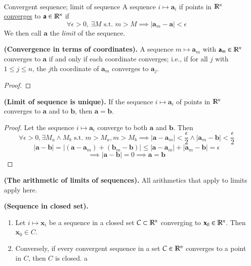 \\

\begin{defn}{Convergent sequence; limit of sequence}
A sequence $i \mapsto \bm{a}_i$ if points in $\mathbb{R}^n$ \ul{converges} to $\textbf{a}\in \mathbb{R}^n$ if
\[\forall \epsilon > 0,\ \exists M \text{ s.t. } m > M \implies |\bm{a}_m-\bm{a}| < \epsilon\]
We then call $\bm{a}$ the \textit{limit} of the sequence.
\end{defn}

\begin{proposition}
  \textbf{(Convergence in terms of coordinates).} A sequence $m\mapsto \bm{a}_m$ with $\textbf{a}_m\in\mathbb{R}^n$ converges to $\bm{a}$ if and only if each coordinate converges; i.e., if for all $j$ with $1\leq j\leq n$, the $j$th coordinate of $\bm{a}_m$ converges to $\bm{a}_j$.
\end{proposition}

\begin{proof}

\end{proof}

\begin{proposition}
\textbf{(Limit of sequence is unique). } If the sequence $i\mapsto \bm{a}_i$ of points in $\mathbb{R}^n$ converges to $\bm{a}$ and to $\bm{b}$, then $\bm{a}=\bm{b}$.
\end{proposition}

\begin{proof}
Let the sequence $i\mapsto \bm{a}_i$ converge to both $\bm{a}$ and $\bm{b}$. Then \[\forall \epsilon > 0, \exists M_a \land M_b \text{ s.t. } m > M_a, m > M_b \implies |\bm{a}-\bm{a}_{m}| < \frac{\epsilon}{2} \land |\bm{a}_{m} - \bm{b}| < \frac{\epsilon}{2}\]
\[|\bm{a}-\bm{b}|=|(\bm{a}-\bm{a}_m)+(\bm{b}_m-\bm{b})| \leq |\bm{a}-\bm{a}_{m}|+ |\bm{a}_{m} - \bm{b}| = \epsilon\]
\[\implies |\bm{a}-\bm{b}| = 0 \implies \bm{a}=\bm{b}\]
\end{proof}

\begin{theorem}
\textbf{(The arithmetic of limits of sequences). } All arithmetics that apply to limits apply here.
\end{theorem}

\begin{proposition}
\textbf{(Sequence in closed set).}
\begin{enumerate}
  \item Let $i\mapsto \bm{x}_i$ be a sequence in a closed set $C \subset \mathbb{R}^n$ converging to $\textbf{x}_0\in \mathbb{R}^n$. Then $\bm{x}_0\in C$.
  \item Conversely, if every convergent sequence in a set $C \in \mathbb{R}^n$ converges to a point in $C$, then $C$ is closed. a
\end{enumerate}
\end{proposition}
